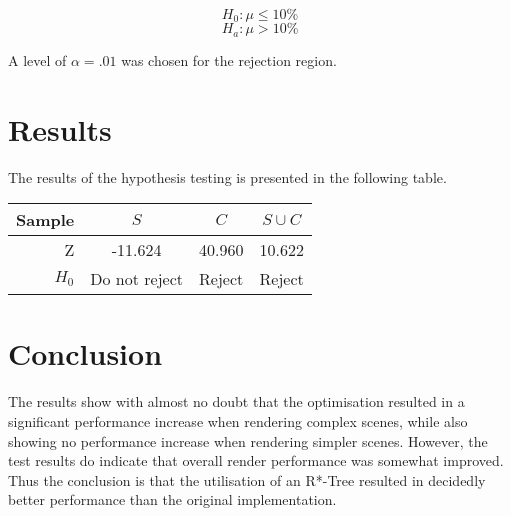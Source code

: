 \documentclass[a4paper]{article}
\begin{document}
$$ H_0: \mu \leq 10\% $$
$$ H_a: \mu > 10\% $$

A level of $\alpha = .01$ was chosen for the rejection region.

\section{Results}

The results of the hypothesis testing is presented in the following table.

\begin{center}
  \begin{tabular}{ | r || c | c | c | }
    \hline
    Sample  & $S$           & $C$    & $S \cup C$ \\ \hline \hline
    Z       & -11.624       & 40.960 & 10.622     \\ \hline
    $H_0$   & Do not reject & Reject & Reject     \\
    \hline
  \end{tabular}
\end{center}

\section{Conclusion}

The results show with almost no doubt that the optimisation resulted in a significant performance increase when rendering complex scenes, while also showing no performance increase when rendering simpler scenes. However, the test results do indicate that overall render performance was somewhat improved. Thus the conclusion is that the utilisation of an R*-Tree resulted in decidedly better performance than the original implementation.
\end{document}
